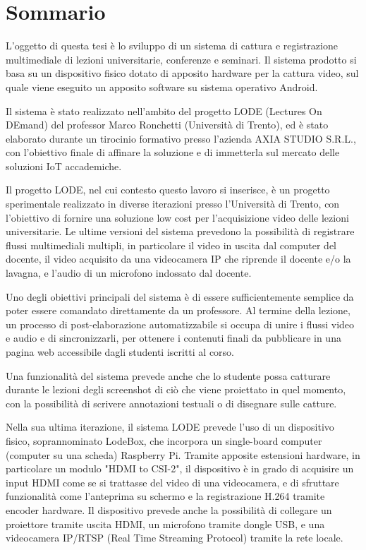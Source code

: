 \chapter*{Sommario} %
\label{sommario}


L'oggetto di questa tesi è lo sviluppo di un sistema di cattura e registrazione multimediale di lezioni universitarie, conferenze e seminari. Il sistema prodotto si basa su un dispositivo fisico dotato di apposito hardware per la cattura video, sul quale viene eseguito un apposito software su sistema operativo Android.

Il sistema è stato realizzato nell'ambito del progetto LODE (Lectures On DEmand) del professor Marco Ronchetti (Università di Trento), ed è stato elaborato durante un tirocinio formativo presso l'azienda AXIA STUDIO S.R.L., con l'obiettivo finale di affinare la soluzione e di immetterla sul mercato delle soluzioni IoT accademiche.

Il progetto LODE, nel cui contesto questo lavoro si inserisce, è un progetto sperimentale realizzato in diverse iterazioni presso l'Università di Trento, con l'obiettivo di fornire una soluzione low cost per l'acquisizione video delle lezioni universitarie. Le ultime versioni del sistema prevedono la possibilità di registrare flussi multimediali multipli, in particolare il video in uscita dal computer del docente, il video acquisito da una videocamera IP che riprende il docente e/o la lavagna, e l'audio di un microfono indossato dal docente.

Uno degli obiettivi principali del sistema è di essere sufficientemente semplice da poter essere comandato direttamente da un professore. Al termine della lezione, un processo di post-elaborazione automatizzabile si occupa di unire i flussi video e audio e di sincronizzarli, per ottenere i contenuti finali da pubblicare in una pagina web accessibile dagli studenti iscritti al corso.

Una funzionalità del sistema prevede anche che lo studente possa catturare durante le lezioni degli screenshot di ciò che viene proiettato in quel momento, con la possibilità di scrivere annotazioni testuali o di disegnare sulle catture.

Nella sua ultima iterazione, il sistema LODE prevede l'uso di un dispositivo fisico, soprannominato LodeBox, che incorpora un single-board computer (computer su una scheda) Raspberry Pi. Tramite apposite estensioni hardware, in particolare un modulo "HDMI to CSI-2", il dispositivo è in grado di acquisire un input HDMI come se si trattasse del video di una videocamera, e di sfruttare funzionalità come l'anteprima su schermo e la registrazione H.264 tramite encoder hardware. Il dispositivo prevede anche la possibilità di collegare un proiettore tramite uscita HDMI, un microfono tramite dongle USB, e una videocamera IP/RTSP (Real Time Streaming Protocol) tramite la rete locale.

